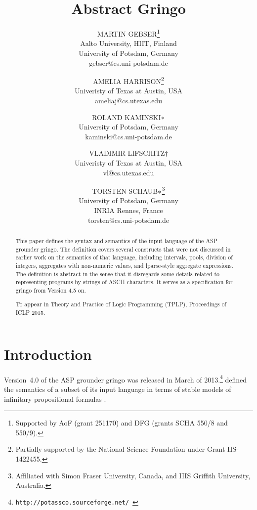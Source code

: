 \documentclass{tlp}
\title{\bf Abstract Gringo}
\author[Gebser et al.]
{MARTIN GEBSER\thanks{Supported by AoF (grant
251170) and DFG (grants SCHA 550/8 and 550/9).}
\\
Aalto University, HIIT, Finland\\
University of Potsdam, Germany\\
gebser@cs.uni-potsdam.de\\
\and
AMELIA HARRISON\thanks{Partially supported
by the National Science Foundation under Grant IIS-1422455.} \\
Univeristy of Texas at Austin, USA\\
ameliaj@cs.utexas.edu\\
\and
ROLAND KAMINSKI$\ast$\\
University of Potsdam, Germany\\
kaminski@cs.uni-potsdam.de\\
\and
VLADIMIR LIFSCHITZ$\dagger$\\
Univeristy of Texas at Austin, USA\\
vl@cs.utexas.edu\\
\and
TORSTEN SCHAUB$\ast$\thanks{Affiliated with Simon Fraser
University, Canada, and IIIS
Griffith University, Australia.}\\
University of Potsdam, Germany\\
INRIA Rennes, France\\
torsten@cs.uni-potsdam.de\\
}
\begin{document}
\maketitle

\begin{abstract}
This paper defines the syntax and semantics of the input language of the
ASP grounder {\sc gringo}.  The definition covers several constructs
that were not discussed in earlier work on the semantics of that language,
including intervals, pools,
division of integers, aggregates with non-numeric values,
and lparse-style aggregate expressions.  The definition is abstract in the
sense that it disregards some details related to representing programs by
strings of ASCII characters.
It serves as a specification for {\sc gringo} from Version 4.5 on.

To appear in Theory and Practice of Logic Programming (TPLP), Proceedings of
ICLP 2015.
\end{abstract}

\section{Introduction}

Version~4.0 of the ASP grounder {\sc gringo} was released in March of
2013.\footnote{\tt http://potassco.sourceforge.net/ \label{ft1}}
\citeyear{har14a} defined the semantics of a subset of its input language
in terms of stable models of infinitary propositional formulas
\cite{tru12}.
\end{document}
